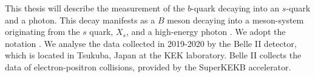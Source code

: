 This thesis will describe the measurement of the $b$-quark decaying into an $s$-quark and a photon. 
This decay manifests as a $B$ meson decaying into a meson-system originating from the $s$ quark, $X_s$, and a high-energy photon \g.
We adopt the notation \BtoXsgamma.
We analyse the data collected in 2019-2020 by the Belle II detector, which is located in Tsukuba, Japan at the KEK laboratory.
Belle II collects the data of electron-positron collisions, provided by the SuperKEKB accelerator.


\BtoKstargamma \cite{PhysRevLett.71.674}
\BtoXsgamma \cite{PhysRevLett.74.2885}